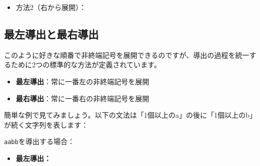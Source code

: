 \begin{itemize}
\tightlist
\item
  方法2（右から展開）：
\end{itemize}

\begin{Shaded}
\begin{Highlighting}[]
\end{Highlighting}
\end{Shaded}

\hypertarget{chapter4-ux6700ux5de6ux5c0eux51faux3068ux6700ux53f3ux5c0eux51fa}{%
\subsection{最左導出と最右導出}\label{chapter4-ux6700ux5de6ux5c0eux51faux3068ux6700ux53f3ux5c0eux51fa}}

このように好きな順番で非終端記号を展開できるのですが、導出の過程を統一するために2つの標準的な方法が定義されています。

\begin{itemize}
\tightlist
\item
  \textbf{最左導出}：常に一番左の非終端記号を展開
\item
  \textbf{最右導出}：常に一番右の非終端記号を展開
\end{itemize}

簡単な例で見てみましょう。以下の文法は「1個以上のa」の後に「1個以上のb」が続く文字列を表します：

\begin{Shaded}
\begin{Highlighting}[]
\end{Highlighting}
\end{Shaded}

\texttt{aabb}を導出する場合：

\begin{itemize}
\tightlist
\item
  \textbf{最左導出：}
\end{itemize}

\begin{Shaded}
\begin{Highlighting}[]
\end{Highlighting}
\end{Shaded}

